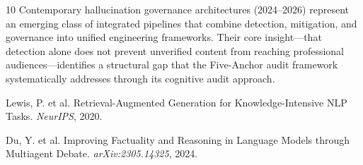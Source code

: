 \documentclass[11pt]{article}
\begin{document}
\begin{thebibliography}{10}
Contemporary hallucination governance architectures (2024--2026) represent an emerging class of integrated
pipelines that combine detection, mitigation, and governance into unified engineering frameworks. Their core
insight---that detection alone does not prevent unverified content from reaching professional audiences---identifies
a structural gap that the Five-Anchor audit framework systematically addresses through its cognitive audit approach.

Lewis, P. et al. Retrieval-Augmented Generation for Knowledge-Intensive NLP Tasks. \textit{NeurIPS}, 2020.

Du, Y. et al. Improving Factuality and Reasoning in Language Models through Multiagent Debate. \textit{arXiv:2305.14325}, 2024.

\end{thebibliography}
\end{document}
